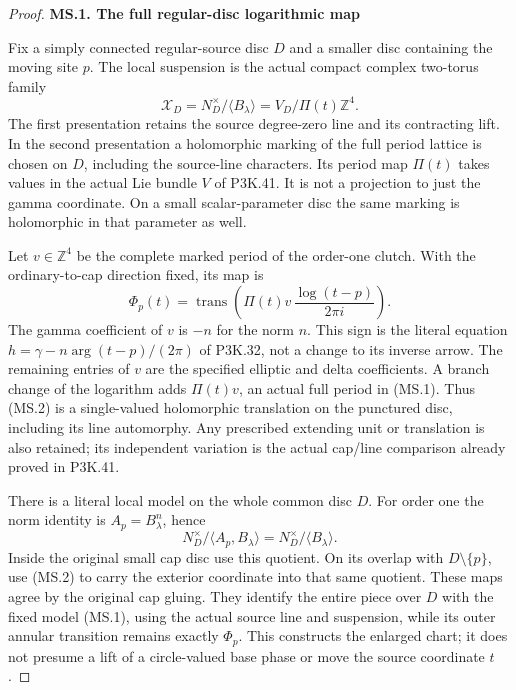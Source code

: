 \begin{proof}
\par

\medskip\noindent\textbf{MS.1. The full regular-disc logarithmic map}

\par\nobreak

Fix a simply connected regular-source disc \(D\) and a smaller disc
containing the moving site \(p\). The local suspension is the actual
compact complex two-torus family
\[
 \mathcal X_D=N_D^\times/\langle B_\lambda\rangle
       =V_D/\Pi(t)\mathbb Z^4.                         \tag{MS.1}
\]
The first presentation retains the source degree-zero line and its
contracting lift. In the second presentation a holomorphic marking of
the full period lattice is chosen on \(D\), including the source-line
characters. Its period map \(\Pi(t)\) takes values in the actual Lie
bundle \(V\) of P3K.41. It is not a projection to just the gamma
coordinate. On a small scalar-parameter disc the same marking is
holomorphic in that parameter as well.

Let \(v\in\mathbb Z^4\) be the complete marked period of the
order-one clutch. With the ordinary-to-cap direction fixed, its map is
\[
 \Phi_p(t)=\operatorname{trans}\left(
       \Pi(t)v\,\frac{\log(t-p)}{2\pi i}\right).        \tag{MS.2}
\]
The gamma coefficient of \(v\) is \(-n\) for the norm \(n\).
This sign is the literal equation
\(h=\gamma-n\arg(t-p)/(2\pi)\) of P3K.32, not a change to its
inverse arrow. The remaining entries of \(v\) are the specified
elliptic and delta coefficients. A branch change of the logarithm adds
\(\Pi(t)v\), an actual full period in (MS.1). Thus (MS.2) is a
single-valued holomorphic translation on the punctured disc, including
its line automorphy. Any prescribed extending unit or translation is
also retained; its independent variation is the actual cap/line
comparison already proved in P3K.41.

There is a literal local model on the whole common disc \(D\).
For order one the norm identity is \(A_p=B_\lambda^n\), hence
\[
 N_D^\times/\langle A_p,B_\lambda\rangle
              =N_D^\times/\langle B_\lambda\rangle .    \tag{MS.3}
\]
Inside the original small cap disc use this quotient. On its overlap
with \(D\setminus\{p\}\), use (MS.2) to carry the exterior
coordinate into that same quotient. These maps agree by the original
cap gluing. They identify the entire piece over \(D\) with the
fixed model (MS.1), using the actual source line and suspension, while
its outer annular transition remains exactly \(\Phi_p\). This
constructs the enlarged chart; it does not presume a lift of a
circle-valued base phase or move the source coordinate \(t\).


\end{proof}
